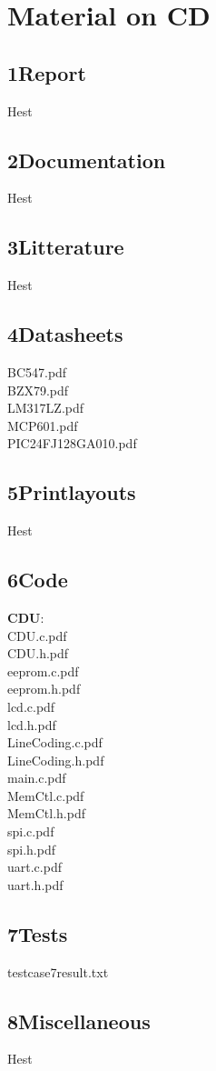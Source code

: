 \chapter{Material on CD}
\section{1Report}
Hest
\section{2Documentation}
Hest
\section{3Litterature}
Hest
\section{4Datasheets}
BC547.pdf\\
BZX79.pdf\\
LM317LZ.pdf\\
MCP601.pdf\\
PIC24FJ128GA010.pdf\\
\section{5Printlayouts}
Hest
\section{6Code}
\textbf{CDU}:\\
CDU.c.pdf\\
CDU.h.pdf\\
eeprom.c.pdf\\
eeprom.h.pdf\\
lcd.c.pdf\\
lcd.h.pdf\\
LineCoding.c.pdf\\
LineCoding.h.pdf\\
main.c.pdf\\
MemCtl.c.pdf\\
MemCtl.h.pdf\\
spi.c.pdf\\
spi.h.pdf\\
uart.c.pdf\\
uart.h.pdf\\
\section{7Tests}
testcase7result.txt\\
\section{8Miscellaneous}
Hest
